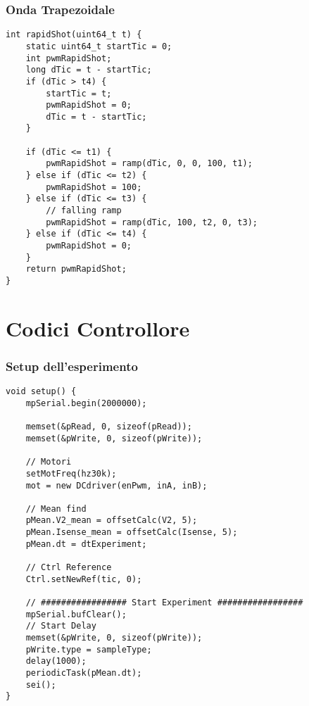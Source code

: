 \subsubsection{Onda Trapezoidale}
\begin{lstlisting}[style=cppStyle,caption={Onda Trapezoidale Periodica},label=lst:ondaTrapezoidale] 
int rapidShot(uint64_t t) {
	static uint64_t startTic = 0;
	int pwmRapidShot;
	long dTic = t - startTic;
	if (dTic > t4) {
		startTic = t;
		pwmRapidShot = 0;
		dTic = t - startTic;
	}
	
	if (dTic <= t1) {
		pwmRapidShot = ramp(dTic, 0, 0, 100, t1);
	} else if (dTic <= t2) {
		pwmRapidShot = 100;
	} else if (dTic <= t3) {
		// falling ramp
		pwmRapidShot = ramp(dTic, 100, t2, 0, t3);
	} else if (dTic <= t4) {
		pwmRapidShot = 0;
	}	
	return pwmRapidShot;
}
\end{lstlisting}

\newpage

\section{Codici Controllore}

\subsubsection{Setup dell'esperimento}
\begin{lstlisting}[style=cppStyle,caption={Loop di Controllo},label=lst:controlSetup] 
void setup() {
	mpSerial.begin(2000000);
	
	memset(&pRead, 0, sizeof(pRead));
	memset(&pWrite, 0, sizeof(pWrite));
	
	// Motori
	setMotFreq(hz30k);
	mot = new DCdriver(enPwm, inA, inB);
	
	// Mean find
	pMean.V2_mean = offsetCalc(V2, 5);
	pMean.Isense_mean = offsetCalc(Isense, 5);
	pMean.dt = dtExperiment;
	
	// Ctrl Reference
	Ctrl.setNewRef(tic, 0);
	
	// ################# Start Experiment #################
	mpSerial.bufClear();
	// Start Delay
	memset(&pWrite, 0, sizeof(pWrite));
	pWrite.type = sampleType;
	delay(1000);
	periodicTask(pMean.dt);
	sei();
}
\end{lstlisting}

